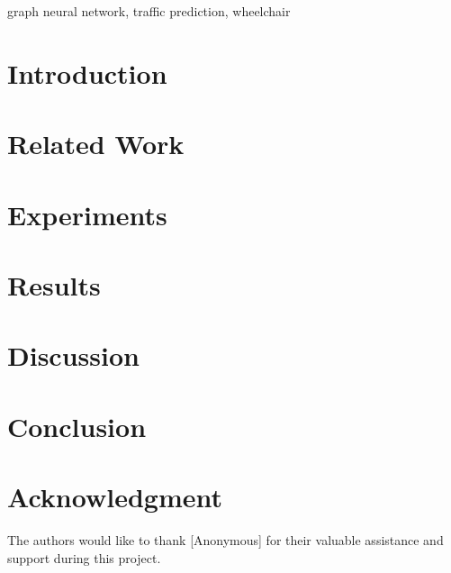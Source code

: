 \documentclass[conference]{IEEEtran}
\begin{document}
    \begin{IEEEkeywords}
        graph neural network, traffic prediction, wheelchair
    \end{IEEEkeywords}


    \section{Introduction}\label{sec:introduction}
    


    \section{Related Work}\label{sec:related-work}
    


    \section{Experiments}\label{sec:experiments}
    


    \section{Results}\label{sec:results}
    


    \section{Discussion}\label{sec:discussion}
    


    \section{Conclusion}\label{sec:conclusion}
    

    \section*{Acknowledgment}
    The authors would like to thank [Anonymous] for their valuable assistance and support during this project.

    
    
\end{document}
